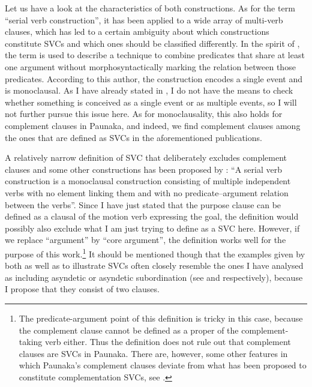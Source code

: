 \largerpage
Let us have a look at the characteristics of both constructions. As for the term “serial verb construction”, it has been applied to a wide array of multi-verb clauses, which has led to a certain ambiguity about which constructions constitute SVCs and which ones should be classified differently. In the spirit of \citet[]{Aikhenvald2006a, Aikhenvald2011,Aikhenvald2018}, the term is used to describe a technique to combine predicates that share at least one argument without morphosyntactically marking the relation between those predicates. According to this author, the construction encodes a single event and is monoclausal. As I have already stated in , I do not have the means to check whether something is conceived as a single event or as multiple events, so I will not further pursue this issue here. As for monoclausality, this also holds for complement clauses in Paunaka, and indeed, we find complement clauses among the ones that are defined as SVCs in the aforementioned publications.

A relatively narrow definition of SVC that deliberately excludes complement clauses and some other constructions has been proposed by \citet[296]{Haspelmath2016}: “A serial verb construction is a monoclausal construction consisting of multiple independent verbs with no element linking them and with no predicate–argument relation between the verbs”. Since I have just stated that the purpose clause can be defined as a clausal  of the motion verb expressing the goal, the definition would possibly also exclude what I am just trying to define as a SVC here. However, if we replace “argument” by “core argument”, the definition works well for the purpose of this work.\footnote{The predicate-argument point of this definition is tricky in this case, because the complement clause cannot be defined as a proper  of the complement-taking verb either. Thus the definition does not rule out that complement clauses are SVCs in Paunaka. There are, however, some other features in which Paunaka’s complement clauses deviate from what has been proposed to constitute complementation SVCs, see .}  It should be mentioned though that the examples given by both \citet[]{Aikhenvald2006a,Aikhenvald2018} as well as \citet[]{Haspelmath2016} to illustrate SVCs often closely resemble the ones I have analysed as including asyndetic  or asyndetic subordination (see  and  respectively), because I propose that they consist of two clauses.

